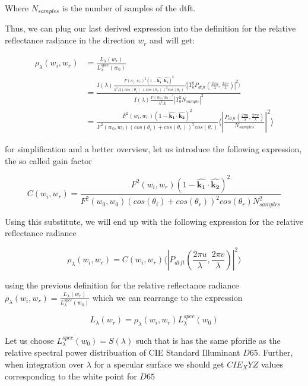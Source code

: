 Where $N_{samples}$ is the number of samples of the dtft.

Thus, we can plug our last derived expression into the definition for the relative reflectance radiance in the direction $w_r$ and will get:

\begin{align*}
\rho_\lambda(w_i,w_r)
& = \frac{L_\lambda(w_r)}{L_\lambda^{spec}(w_0)} \\
& = \frac{I(\lambda) \frac{F(w_i, w_r)^2 (1-\hat{\mathbf{k_1}}\cdot\hat{\mathbf{k_2}})^2}{\lambda^2 A (cos(\theta_i)+cos(\theta_r))^2 cos(\theta_r)} \langle \left|T_0^2 P_{dtft}(\frac{2\pi u}{\lambda}, \frac{2\pi v}{\lambda})  \right|^2\rangle}{I(\lambda) \frac{F(w_0, w_0)^2}{\lambda^2 A}\left| T_0^2 N_{sample} \right|^2 } \\
& = \frac{F^2(w_i,w_r)(1-\hat{\mathbf{k_1}}\cdot\hat{\mathbf{k_2}})^2}{F^2(w_0,w_0)(cos(\theta_i)+cos(\theta_r))^2 cos(\theta_r)}  \langle \left|\frac{P_{dtft}(\frac{2\pi u}{\lambda}, \frac{2\pi v}{\lambda})}{N_{samples}}\right|^2\rangle
\end{align*}

for simplification and a better overview, let us introduce the following expression, the so called gain factor

\begin{equation}
    C(w_i,w_r) = \frac{F^2(w_i,w_r)(1-\hat{\mathbf{k_1}}\cdot\hat{\mathbf{k_2}})^2}{F^2(w_0,w_0)(cos(\theta_i)+cos(\theta_r))^2 cos(\theta_r) N_{samples}^2}
\end{equation}

Using this substitute, we will end up with the following expression for the relative reflectance radiance

\begin{equation}
\rho_\lambda(w_i,w_r) =  C(w_i,w_r) \langle \left|P_{dtft}(\frac{2\pi u}{\lambda}, \frac{2\pi v}{\lambda})\right|^2\rangle
\end{equation}

using the previous definition for the relative reflectance radiance $\rho_\lambda(w_i,w_r) = \frac{L_\lambda(w_r)}{L_\lambda^{spec}(w_0)}$ which we can rearrange to the expression 

\begin{equation}
L_\lambda(w_r) = \rho_\lambda(w_i,w_r)L_\lambda^{spec}(w_0)
\end{equation}

Let us choose $L_\lambda^{spec}(w_0) = S(\lambda)$ such that is has the same pforifle as the relative spectral power distribuation of CIE Standard Illuminant $D65$. Further, when integration over $\lambda$ for a specular surface we should get $CIE_XYZ$ values corresponding to the white point for $D65$ 

